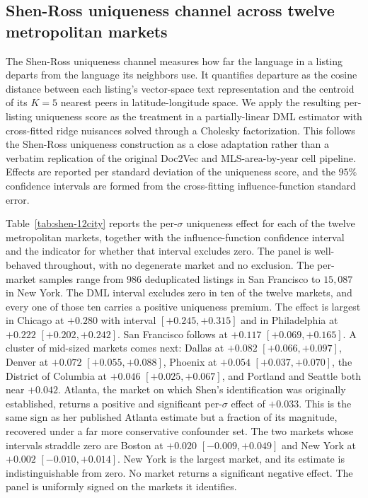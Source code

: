
\subsection{Shen-Ross uniqueness channel across twelve metropolitan markets}
\label{sec:shen-12city}

The Shen-Ross uniqueness channel \citep{shen2021information} measures how far the
language in a listing departs from the language its neighbors use. It quantifies
departure as the cosine distance between each listing's vector-space text
representation and the centroid of its $K = 5$ nearest peers in
latitude-longitude space. We apply the resulting per-listing uniqueness score as
the treatment in a partially-linear DML estimator with cross-fitted ridge
nuisances solved through a Cholesky factorization. This follows the Shen-Ross
uniqueness construction as a close adaptation rather than a verbatim replication
of the original Doc2Vec and MLS-area-by-year cell pipeline. Effects are reported
per standard deviation of the uniqueness score, and the $95\%$ confidence
intervals are formed from the cross-fitting influence-function standard error.

Table~\ref{tab:shen-12city} reports the per-$\sigma$ uniqueness effect for each
of the twelve metropolitan markets, together with the influence-function
confidence interval and the indicator for whether that interval excludes zero.
The panel is well-behaved throughout, with no degenerate market and no exclusion.
The per-market samples range from $986$ deduplicated listings in San Francisco to
$15{,}087$ in New York. The DML interval excludes zero in ten of the twelve
markets, and every one of those ten carries a positive uniqueness premium. The
effect is largest in Chicago at $+0.280$ with interval $[+0.245, +0.315]$
and in Philadelphia at $+0.222$ $[+0.202, +0.242]$. San Francisco follows at
$+0.117$ $[+0.069, +0.165]$. A cluster of mid-sized markets comes next: Dallas
at $+0.082$ $[+0.066, +0.097]$, Denver at $+0.072$ $[+0.055, +0.088]$, Phoenix at
$+0.054$ $[+0.037, +0.070]$, the District of Columbia at $+0.046$
$[+0.025, +0.067]$, and Portland and Seattle both near $+0.042$. Atlanta, the
market on which Shen's identification was originally established, returns a
positive and significant per-$\sigma$ effect of $+0.033$. This is the same sign as her
published Atlanta estimate but a fraction of its magnitude, recovered
under a far more conservative confounder set. The two markets whose intervals
straddle zero are Boston at $+0.020$ $[-0.009, +0.049]$ and New York at $+0.002$
$[-0.010, +0.014]$. New York is the largest market, and its estimate is
indistinguishable from zero. No market returns a significant negative effect. The
panel is uniformly signed on the markets it identifies.

